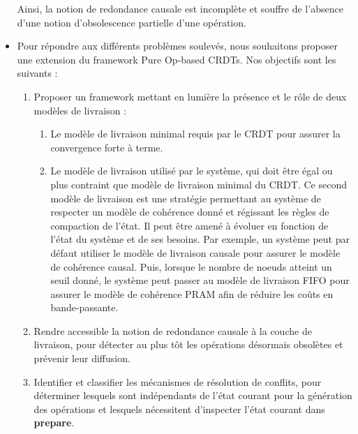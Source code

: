 \begin{itemize}
        Ainsi, la notion de redondance causale est incomplète et souffre de l'absence d'une notion d'obsolescence partielle d'une opération.
    \item Pour répondre aux différents problèmes soulevés, nous souhaitons proposer une extension du framework Pure Op-based \acp{CRDT}.
        Nos objectifs sont les suivants :
        \begin{enumerate}
            \item Proposer un framework mettant en lumière la présence et le rôle de deux modèles de livraison :
                \begin{enumerate}
                    \item Le modèle de livraison minimal requis par le \ac{CRDT} pour assurer la convergence forte à terme.
                    \item Le modèle de livraison utilisé par le système, qui doit être égal ou plus contraint que modèle de livraison minimal du \ac{CRDT}.
                        Ce second modèle de livraison est une stratégie permettant au système de respecter un modèle de cohérence donné et régissant les règles de compaction de l'état.
                        Il peut être amené à évoluer en fonction de l'état du système et de ses besoins.
                        Par exemple, un système peut par défaut utiliser le modèle de livraison causale pour assurer le modèle de cohérence causal.
                        Puis, lorsque le nombre de noeuds atteint un seuil donné, le système peut passer au modèle de livraison FIFO pour assurer le modèle de cohérence PRAM afin de réduire les coûts en bande-passante.
                \end{enumerate}
            \item Rendre accessible la notion de redondance causale à la couche de livraison, pour détecter au plus tôt les opérations désormais obsolètes et prévenir leur diffusion.
            \item Identifier et classifier les mécanismes de résolution de conflits, pour déterminer lesquels sont indépendants de l'état courant pour la génération des opérations et lesquels nécessitent d'inspecter l'état courant dans \textbf{prepare}.
        \end{enumerate}
\end{itemize}
